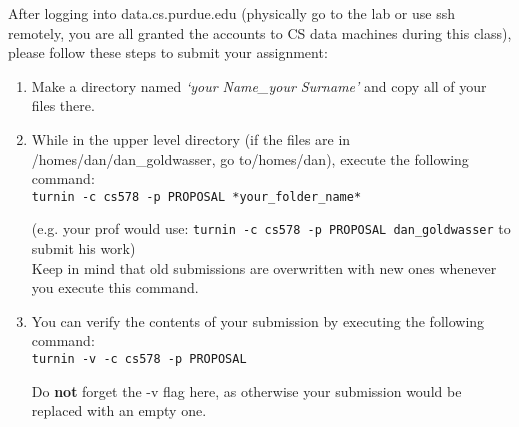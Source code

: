 \documentclass[11pt]{article}
\begin{document}
After logging into data.cs.purdue.edu (physically go to the lab or use ssh remotely, you are all granted the accounts to CS data machines during this class), please follow these steps to submit your assignment:
\begin{enumerate}
	\item Make a directory named \textit{`your Name\_your Surname'} and copy all of your files there.
	\item While in the upper level directory (if the files are in /homes/dan/dan\_goldwasser, go to/homes/dan), execute the following command:\\

	\texttt{turnin -c cs578 -p PROPOSAL *your\_folder\_name*}
		
	(e.g. your prof would use: \texttt{turnin -c cs578 -p PROPOSAL dan\_goldwasser} to submit his work)\\
		
	Keep in mind that old submissions are overwritten with new ones whenever you execute this
command.\\

	\item You can verify the contents of your submission by executing the following command:\\
	
	\texttt{turnin -v -c cs578 -p PROPOSAL\\}

	Do \textbf{not} forget the -v flag here, as otherwise your submission would be replaced with an empty
one.
\end{enumerate}


%

\end{document}
